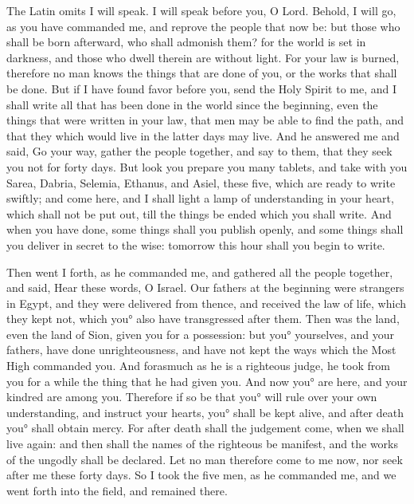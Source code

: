 {{The Latin omits
I will speak.
} I will speak before you, O Lord.
Behold, I will go, as you have commanded me, and reprove the people that now be: but those who shall be born afterward, who shall admonish them? for the world is set in darkness, and those who dwell therein are without light.
For your law is burned, therefore no man knows the things that are done of you, or the works that shall be done.
But if I have found favor before you, send the Holy Spirit to me, and I shall write all that has been done in the world since the beginning, even the things that were written in your law, that men may be able to find the path, and that they which would live in the latter days may live.
And he answered me and said, Go your way, gather the people together, and say to them, that they seek you not for forty days.
But look you prepare you many tablets, and take with you Sarea, Dabria, Selemia, Ethanus, and Asiel, these five, which are ready to write swiftly;
and come here, and I shall light a lamp of understanding in your heart, which shall not be put out, till the things be ended which you shall write.
And when you have done, some things shall you publish openly, and some things shall you deliver in secret to the wise: tomorrow this hour shall you begin to write.
\par }{\PP {}Then went I forth, as he commanded me, and gathered all the people together, and said,
Hear these words, O Israel.
Our fathers at the beginning were strangers in Egypt, and they were delivered from thence,
and received the law of life, which they kept not, which you° also have transgressed after them.
Then was
 the land, even the land of Sion, given you for a possession: but you° yourselves, and your fathers, have done unrighteousness, and have not kept the ways which the Most High commanded you.
And forasmuch as he is a righteous judge, he took from you for a while the thing that he had given you.
And now you° are here, and your kindred are among you.
Therefore if so be that you° will rule over your own understanding, and instruct your hearts, you° shall be kept alive, and after death you° shall obtain mercy.
For after death shall the judgement come, when we shall live again: and then shall the names of the righteous be manifest, and the works of the ungodly shall be declared.
Let no man therefore come to me now, nor seek after me these forty days.
So I took the five men, as he commanded me, and we went forth into the field, and remained there.
}
